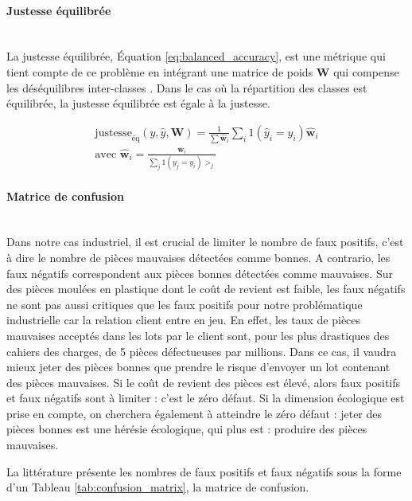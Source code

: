 \paragraph{Justesse équilibrée}\mbox{} \\
La justesse équilibrée, Équation \ref{eq:balanced_accuracy}, est une métrique qui tient compte de ce problème en intégrant une matrice de poids $\mathbf{W}$ qui compense les déséquilibres inter-classes \cite{brodersen_balanced_2010, mosley_balanced_2013}.
Dans le cas où la répartition des classes est équilibrée, la justesse équilibrée est égale à la justesse.

\begin{equation} \label{eq:balanced_accuracy}
\begin{split}
\text{justesse}_{\text{éq}}(y, \hat{y}, \mathbf{W})=\frac{1}{\sum \hat{\mathbf{w}}_{i}} \sum_{i} 1\left(\hat{y}_{i}=y_{i}\right) \hat{\mathbf{w}}_{i}
\\
\text{avec } \hat{\mathbf{w}}_{i}=\frac{\mathbf{w}_{i}}{\sum_{j} 1\left(y_{j}=y_{i}\right) >_{j}}
\end{split}
\end{equation}

\paragraph{Matrice de confusion}\mbox{} \\
Dans notre cas industriel, il est crucial de limiter le nombre de faux positifs, c'est à dire le nombre de pièces mauvaises détectées comme bonnes.
A contrario, les faux négatifs correspondent aux pièces bonnes détectées comme mauvaises.
Sur des pièces moulées en plastique dont le coût de revient est faible, les faux négatifs ne sont pas aussi critiques que les faux positifs pour notre problématique industrielle car la relation client entre en jeu.
En effet, les taux de pièces mauvaises acceptés dans les lots par le client sont, pour les plus drastiques des cahiers des charges, de 5 pièces défectueuses par millions.
Dans ce cas, il vaudra mieux jeter des pièces bonnes que prendre le risque d'envoyer un lot contenant des pièces mauvaises.
Si le coût de revient des pièces est élevé, alors faux positifs et faux négatifs sont à limiter : c'est le zéro défaut.
Si la dimension écologique est prise en compte, on cherchera également à atteindre le zéro défaut : jeter des pièces bonnes est une hérésie écologique, qui plus est : produire des pièces mauvaises.

La littérature présente les nombres de faux positifs et faux négatifs sous la forme d'un Tableau \ref{tab:confusion_matrix}, la matrice de confusion.

